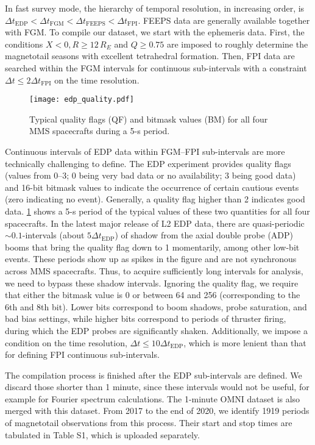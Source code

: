 \documentclass[draft,jgrga]{agutexSI2019}
\begin{document}
\begin{article}
In fast survey mode, the hierarchy of temporal resolution, in increasing order, is $\Delta t_\text{EDP}<\Delta t_\text{FGM}<\Delta t_\text{FEEPS}<\Delta t_\text{FPI}$. FEEPS data are generally available together with FGM. To compile our dataset, we start with the ephemeris data. First, the conditions ${X<0,R\geq 12\,\si{R_E}}$ and ${Q\geq 0.75}$ are imposed to roughly determine the magnetotail seasons with excellent tetrahedral formation. Then, FPI data are searched within the FGM intervals for continuous sub-intervals with a constraint ${\Delta t\leq 2\Delta t_\text{FPI}}$ on the time resolution.

\begin{figure}
\centering
\noindent\texttt{[image: edp\_quality.pdf]}
\caption{
Typical quality flags (QF) and bitmask values (BM) for all four MMS spacecrafts during a 5-s period.
}
\label{fig:edp_quality}
\end{figure}

Continuous intervals of EDP data within FGM--FPI sub-intervals are more technically challenging to define. The EDP experiment provides quality flags (values from 0--3; 0 being very bad data or no availability; 3 being good data) and 16-bit bitmask values to indicate the occurrence of certain cautious events (zero indicating no event). Generally, a quality flag higher than 2 indicates good data. \cref{fig:edp_quality} shows a 5-s period of the typical values of these two quantities for all four spacecrafts. In the latest major release of L2 EDP data, there are quasi-periodic $\sim 0.1$-intervals (about $5\Delta t_\text{EDP}$) of shadow from the axial double probe (ADP) booms that bring the quality flag down to 1 momentarily, among other low-bit events. These periods show up as spikes in the figure and are not synchronous across MMS spacecrafts. Thus, to acquire sufficiently long intervals for analysis, we need to bypass these shadow intervals. Ignoring the quality flag, we require that either the bitmask value is 0 or between 64 and 256 (corresponding to the 6th and 8th bit). Lower bits correspond to boom shadows, probe saturation, and bad bias settings, while higher bits correspond to periods of thruster firing, during which the EDP probes are significantly shaken. Additionally, we impose a condition on the time resolution, ${\Delta t\leq 10\Delta t_\text{EDP}}$, which is more lenient than that for defining FPI continuous sub-intervals.

The compilation process is finished after the EDP sub-intervals are defined. We discard those shorter than 1 minute, since these intervals would not be useful, for example for Fourier spectrum calculations. The 1-minute OMNI dataset \cite{King2005} is also merged with this dataset. From 2017 to the end of 2020, we identify 1919 periods of magnetotail observations from this process. Their start and stop times are tabulated in Table S1, which is uploaded separately.


\end{article}
\end{document}
